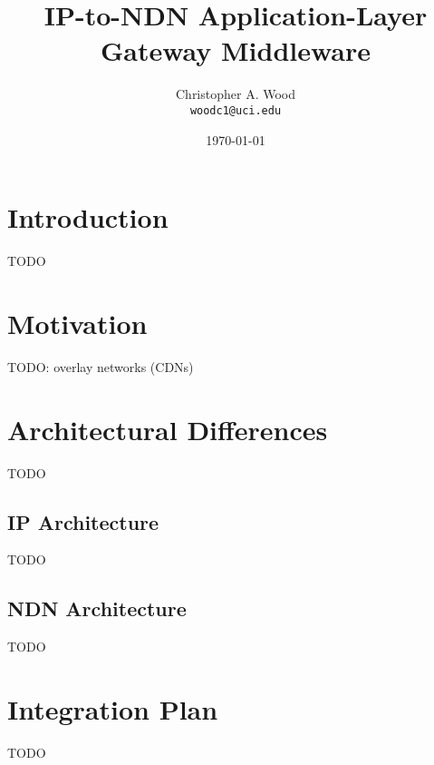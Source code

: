 \documentclass[10pt]{article}
\begin{document}
\title{IP-to-NDN Application-Layer Gateway Middleware}
\author{Christopher A. Wood \\ {\tt woodc1@uci.edu}}
\date{\today}
\maketitle


\section{Introduction}
TODO

\section{Motivation}
TODO: overlay networks (CDNs)

\section{Architectural Differences}
TODO

\subsection{IP Architecture}
TODO

\subsection{NDN Architecture}
TODO

\section{Integration Plan}
TODO


\begin{thebibliography}{[MT1]}




\end{thebibliography}
\end{document}
